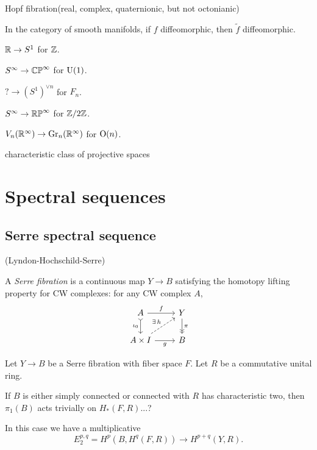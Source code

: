 \documentclass{../../large}
\begin{document}
Hopf fibration(real, complex, quaternionic, but not octonianic)

In the category of smooth manifolds, if $f$ diffeomorphic, then $\tilde f$ diffeomorphic.



\begin{prb}
\begin{parts}
\item $\mathbb{R}\to S^1$ for $\mathbb{Z}$.
\item $S^\infty\to\mathbb{CP}^\infty$ for $\mathrm{U}(1)$.
\item $?\to(S^1)^{\vee n}$ for $F_n$.
\item $S^\infty\to\mathbb{RP}^\infty$ for $\mathbb{Z}/2\mathbb{Z}$.
\item $V_n(\mathbb{R}^\infty)\to\mathrm{Gr}_n(\mathbb{R}^\infty)$ for $\mathrm{O}(n)$.
\end{parts}
\end{prb}



characteristic class of projective spaces
















\chapter{Spectral sequences}
\section{Serre spectral sequence}
	(Lyndon-Hochschild-Serre)



A \emph{Serre fibration} is a continuous map $Y\to B$ satisfying the homotopy lifting property for CW complexes: for any CW complex $A$,
\[\begin{tikzcd}
A\rar{f}\dar[>->,swap]{\iota_0}&Y\dar[->>]{\pi}\\
A\times I\rar[swap]{g}\ar[dashed]{ur}{\exists\,h}&B
\end{tikzcd}\]


\begin{prb}
Let $Y\to B$ be a Serre fibration with fiber space $F$.
Let $R$ be a commutative unital ring.
\begin{parts}
\item If $B$ is either simply connected or connected with $R$ has characteristic two, then $\pi_1(B)$ acts trivially on $H_*(F,R)$...?
\item In this case we have a multiplicative
\[E_2^{p,q}=H^p(B,H^q(F,R))\rightarrow H^{p+q}(Y,R).\]
\end{parts}
\end{prb}
\end{document}
